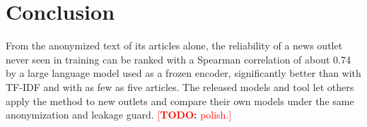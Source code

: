\documentclass[11pt,a4paper]{article}
\newcommand{\todo}[1]{\textcolor{red}{[\textbf{TODO:} #1]}}
\begin{document}
\section{Conclusion}\label{sec:conclusion}
From the anonymized text of its articles alone, the reliability of a news outlet never seen in training can be
ranked with a Spearman correlation of about 0.74 by a large language model used as a frozen encoder, significantly
better than with TF-IDF and with as few as five articles. The released models and tool let others apply the
method to new outlets and compare their own models under the same anonymization and leakage guard. \todo{polish.}



\end{document}
